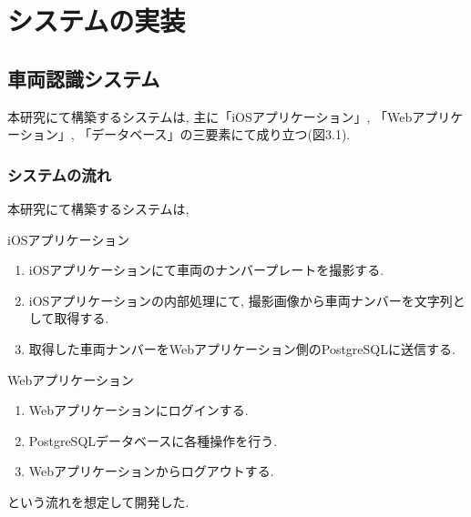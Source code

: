 \chapter{システムの実装}
\label{chap:poordirection}

\section{車両認識システム}
本研究にて構築するシステムは, 主に「iOSアプリケーション」, 「Webアプリケーション」, 「データベース」の三要素にて成り立つ(図3.1).

\subsection{システムの流れ}
本研究にて構築するシステムは,
\begin{screen}
\begin{itembox}[l]{iOSアプリケーション}
\begin{enumerate}
\item iOSアプリケーションにて車両のナンバープレートを撮影する.
\item iOSアプリケーションの内部処理にて, 撮影画像から車両ナンバーを文字列として取得する.
\item 取得した車両ナンバーをWebアプリケーション側のPostgreSQLに送信する.
\end{enumerate}
\end{itembox}

\begin{itembox}[l]{Webアプリケーション}
\begin{enumerate}
\item Webアプリケーションにログインする.
\item PostgreSQLデータベースに各種操作を行う.
\item Webアプリケーションからログアウトする.
\end{enumerate}
\end{itembox}
\end{screen}
という流れを想定して開発した.

